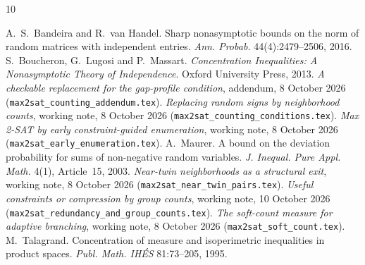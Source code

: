 \documentclass[11pt,a4paper]{article}
\theoremstyle{definition}
\theoremstyle{remark}
\begin{document}
\begin{thebibliography}{10}
\small\raggedright
{} A.~S.~Bandeira and R.~van Handel. Sharp nonasymptotic bounds on
 the norm of random matrices with independent entries. \emph{Ann. Probab.}
 44(4):2479--2506, 2016.
 S.~Boucheron, G.~Lugosi and P.~Massart. \emph{Concentration
 Inequalities: A Nonasymptotic Theory of Independence}. Oxford University
 Press, 2013.
 \emph{A checkable replacement for the gap-profile condition},
 addendum, 8 October 2026 (\texttt{max2sat\_counting\_addendum.tex}).
 \emph{Replacing random signs by neighborhood counts}, working note,
 8 October 2026 (\texttt{max2sat\_counting\_conditions.tex}).
 \emph{Max 2-SAT by early constraint-guided enumeration}, working
 note, 8 October 2026 (\texttt{max2sat\_early\_enumeration.tex}).
 A.~Maurer. A bound on the deviation probability for sums of
 non-negative random variables. \emph{J. Inequal. Pure Appl. Math.} 4(1),
 Article~15, 2003.
 \emph{Near-twin neighborhoods as a structural exit}, working note,
 8 October 2026 (\texttt{max2sat\_near\_twin\_pairs.tex}).
 \emph{Useful constraints or compression by group counts}, working
 note, 10 October 2026 (\texttt{max2sat\_redundancy\_and\_group\_counts.tex}).
 \emph{The soft-count measure for adaptive branching}, working
 note, 8 October 2026 (\texttt{max2sat\_soft\_count.tex}).
 M.~Talagrand. Concentration of measure and isoperimetric
 inequalities in product spaces. \emph{Publ. Math. IH\'ES} 81:73--205, 1995.
\end{thebibliography}
\end{document}
